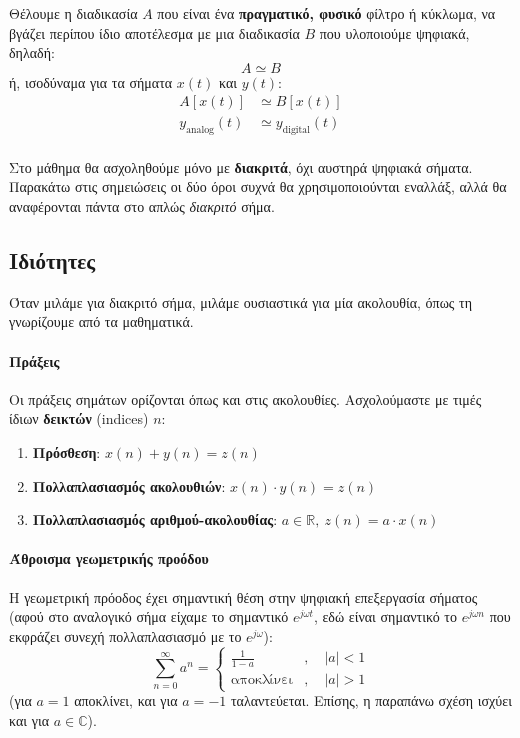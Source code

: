\documentclass[11pt,a4paper,notitlepage,fleqn,draft]{article}
\begin{document}
Θέλουμε η διαδικασία \( A \) που είναι ένα \textbf{πραγματικό, φυσικό} φίλτρο ή κύκλωμα, να βγάζει
περίπου ίδιο αποτέλεσμα με μια διαδικασία \( B \) που υλοποιούμε ψηφιακά, δηλαδή:
\[
A \simeq B
\]
ή, ισοδύναμα για τα σήματα \( x(t) \) και \( y(t) \):
\begin{align*}
	A\left[x(t)\right] &\simeq B\left[x(t)\right] \\
	y_{\mathrm{analog}}(t) &\simeq y_{\mathrm{digital}}(t)
\end{align*}

\paragraph{}
Στο μάθημα θα ασχοληθούμε μόνο με \textbf{διακριτά}, όχι αυστηρά ψηφιακά σήματα. Παρακάτω στις σημειώσεις οι δύο όροι
συχνά θα χρησιμοποιούνται εναλλάξ, αλλά θα αναφέρονται πάντα στο απλώς \emph{διακριτό} σήμα.

\subsection{Ιδιότητες}
Όταν μιλάμε για διακριτό σήμα, μιλάμε ουσιαστικά για μία ακολουθία, όπως τη γνωρίζουμε από τα μαθηματικά.

\paragraph{Πράξεις}
Οι πράξεις σημάτων ορίζονται όπως και στις ακολουθίες. Ασχολούμαστε με τιμές ίδιων \textbf{δεικτών} (indices) \( n \):
\begin{enumerate}
	\item \textbf{Πρόσθεση}: \( x(n) + y(n) = z(n) \)
	\item \textbf{Πολλαπλασιασμός ακολουθιών}: \( x(n) \cdot y(n) = z(n) \)
	\item \textbf{Πολλαπλασιασμός αριθμού-ακολουθίας}: \( a\in\mathbb R,\ z(n) = a\cdot x(n) \)
\end{enumerate}

\paragraph{Άθροισμα γεωμετρικής προόδου}
Η γεωμετρική πρόοδος έχει σημαντική θέση στην ψηφιακή επεξεργασία σήματος (αφού στο αναλογικό σήμα
είχαμε το σημαντικό \( e^{j\omega t} \), εδώ είναι σημαντικό το \( e^{j\omega n} \) που εκφράζει συνεχή πολλαπλασιασμό με το \( e^{j\omega } \)):
\[
\sum_{n=0}^{\infty} a^n
= \begin{cases}
\displaystyle \frac{1}{1-a} &,\quad |a|<1\\
\text{αποκλίνει}&,\quad |a|>1
\end{cases}
\]
(για \( a=1 \) αποκλίνει, και για \( a=-1 \) ταλαντεύεται. Επίσης, η παραπάνω σχέση ισχύει και για
\( a\in\mathbb C \)).
\end{document}
